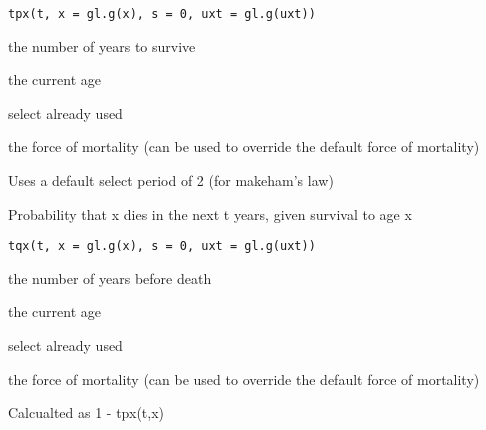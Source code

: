 \documentclass[a4paper]{book}
\begin{document}
%
\begin{Usage}
\begin{verbatim}
tpx(t, x = gl.g(x), s = 0, uxt = gl.g(uxt))
\end{verbatim}
\end{Usage}
%
\begin{Arguments}
\begin{ldescription}
\item[\code{t}] the number of years to survive

\item[\code{x}] the current age

\item[\code{s}] select already used

\item[\code{uxt}] the force of mortality (can be used to override the default force of mortality)
\end{ldescription}
\end{Arguments}
%
\begin{Details}\relax
Uses a default select period of 2 (for makeham's law)
\end{Details}
%
\begin{Description}\relax
Probability that x dies in the next t years, given survival to age x
\end{Description}
%
\begin{Usage}
\begin{verbatim}
tqx(t, x = gl.g(x), s = 0, uxt = gl.g(uxt))
\end{verbatim}
\end{Usage}
%
\begin{Arguments}
\begin{ldescription}
\item[\code{t}] the number of years before death

\item[\code{x}] the current age

\item[\code{s}] select already used

\item[\code{uxt}] the force of mortality (can be used to override the default force of mortality)
\end{ldescription}
\end{Arguments}
%
\begin{Details}\relax
Calcualted as 1 - tpx(t,x)
\end{Details}
\end{document}
